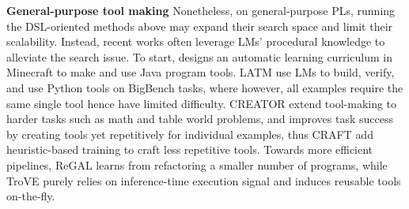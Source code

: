 \noindent \textbf{General-purpose tool making} \quad
Nonetheless, on general-purpose PLs, running the DSL-oriented methods above may expand their search space and limit their scalability. Instead, recent works often leverage LMs' procedural knowledge to alleviate the search issue. 
To start, \citet{wang2023voyager} designs an automatic learning curriculum in Minecraft to make and use Java program tools.
LATM \citep{} use LMs to build, verify, and use Python tools on BigBench \citep{srivastava2023beyond} tasks, where however, all examples require the same single tool hence have limited difficulty.
CREATOR \citep{qian2023creator} extend tool-making to harder tasks such as math and table world problems, and improves task success by creating tools yet repetitively for individual examples, thus CRAFT \citep{yuan2023craft} add heuristic-based training to craft less repetitive tools.
Towards more efficient pipelines, ReGAL \citep{stengeleskin2024regal} learns from refactoring a smaller number of programs, while TroVE \citep{wang2024trove} purely relies on inference-time execution signal and induces reusable tools on-the-fly.
